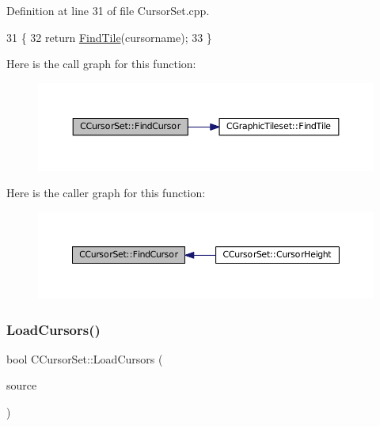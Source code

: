 Definition at line 31 of file Cursor\+Set.\+cpp.


\begin{DoxyCode}
31                                                            \{
32     \textcolor{keywordflow}{return} \hyperlink{classCGraphicTileset_ab8f2c2b2f2095b17d53c3dc475d5685c}{FindTile}(cursorname);
33 \}
\end{DoxyCode}
Here is the call graph for this function\+:\nopagebreak
\begin{figure}[H]
\begin{center}
\leavevmode
\includegraphics[width=350pt]{classCCursorSet_a6a7ee8b41e6de490a7817b3f3ce5fb9f_cgraph}
\end{center}
\end{figure}
Here is the caller graph for this function\+:\nopagebreak
\begin{figure}[H]
\begin{center}
\leavevmode
\includegraphics[width=350pt]{classCCursorSet_a6a7ee8b41e6de490a7817b3f3ce5fb9f_icgraph}
\end{center}
\end{figure}
\hypertarget{classCCursorSet_abde01bde36a926de4d2de67e48be0cc0}{}\label{classCCursorSet_abde01bde36a926de4d2de67e48be0cc0} 
\subsubsection{\texorpdfstring{Load\+Cursors()}{LoadCursors()}}
{\footnotesize\ttfamily bool C\+Cursor\+Set\+::\+Load\+Cursors (\begin{DoxyParamCaption}\item[{std\+::shared\+\_\+ptr$<$ \hyperlink{classCDataSource}{C\+Data\+Source} $>$}]{source }\end{DoxyParamCaption})}



